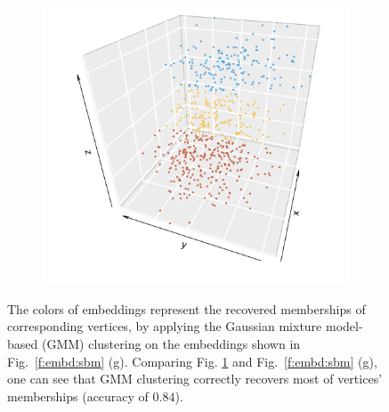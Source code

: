 \documentclass[10pt,journal,compsoc]{IEEEtran}
\numberwithin{equation}{section}
\begin{document}
\begin{figure}[htbp]
\centering
\begin{subfigure}{.38\columnwidth}
\includegraphics[width=\columnwidth]{figimprove.png}%
\end{subfigure}
\caption{The colors of embeddings represent the recovered memberships of corresponding vertices, by applying the Gaussian mixture model-based (GMM) clustering on the embeddings shown in Fig.~\ref{f:embd:sbm} (g). Comparing Fig. \ref{fig:improve} and Fig.~\ref{f:embd:sbm} (g), one can see that GMM clustering correctly recovers most of vertices' memberships (accuracy of $0.84$).}
\label{fig:improve}
\end{figure}
\end{document}
